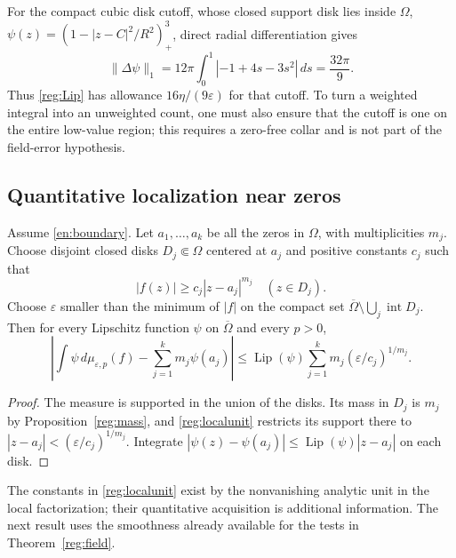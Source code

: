For the compact cubic disk cutoff, whose closed support disk lies inside $\Omega$,
$\psi(z)=(1-|z-C|^2/R^2)_+^3$, direct radial differentiation gives
\[
 \|\Delta\psi\|_1
 =12\pi\int_0^1|{-1+4s-3s^2}|\,ds=\frac{32\pi}{9}.
\]
Thus \eqref{reg:Lip} has allowance $16\eta/(9\varepsilon)$ for that
cutoff. To turn a weighted integral into an unweighted count, one must
also ensure that the cutoff is one on the entire low-value region; this
requires a zero-free collar and is not part of the field-error hypothesis.

\subsection{Quantitative localization near zeros}
\begin{proposition}\label{reg:bias}
Assume \eqref{en:boundary}. Let $a_1,\ldots,a_k$ be all the zeros in
$\Omega$, with multiplicities $m_j$. Choose disjoint closed disks
$D_j\Subset\Omega$ centered at $a_j$ and positive constants $c_j$ such
that
\begin{equation}\label{reg:localunit}
 |f(z)|\ge c_j|z-a_j|^{m_j}\quad(z\in D_j).
\end{equation}
Choose $\varepsilon$ smaller than the minimum of $|f|$ on the compact set $\overline\Omega\setminus\bigcup_j\operatorname{int}D_j$. Then for every Lipschitz
function $\psi$ on $\overline\Omega$ and every $p>0$,
\begin{equation}\label{reg:biasbound}
 \left|\int\psi\,d\mu_{\varepsilon,p}(f)
               -\sum_{j=1}^k m_j\psi(a_j)\right|
 \le \operatorname{Lip}(\psi)
          \sum_{j=1}^k m_j(\varepsilon/c_j)^{1/m_j}.
\end{equation}
\end{proposition}
\begin{proof}
The measure is supported in the union of the disks. Its mass in $D_j$
is $m_j$ by Proposition~\ref{reg:mass}, and \eqref{reg:localunit}
restricts its support there to
$|z-a_j|<(\varepsilon/c_j)^{1/m_j}$. Integrate
$|\psi(z)-\psi(a_j)|\le\operatorname{Lip}(\psi)|z-a_j|$ on each disk.
\end{proof}

The constants in \eqref{reg:localunit} exist by the nonvanishing analytic
unit in the local factorization; their quantitative acquisition is
additional information. The next result uses the smoothness already
available for the tests in Theorem~\ref{reg:field}.

